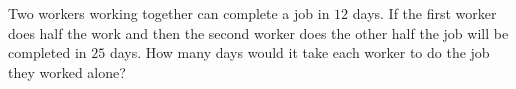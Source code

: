 
%
%
%
%
% 
% 

\question Two workers working together can complete a job in $12$ days. If the first worker does half the work and then the second worker does the other half the job will be completed in $25$ days. How many days would it take each worker to do the job they worked alone?

\insertQR{}

\ifprintanswers
\fi 

